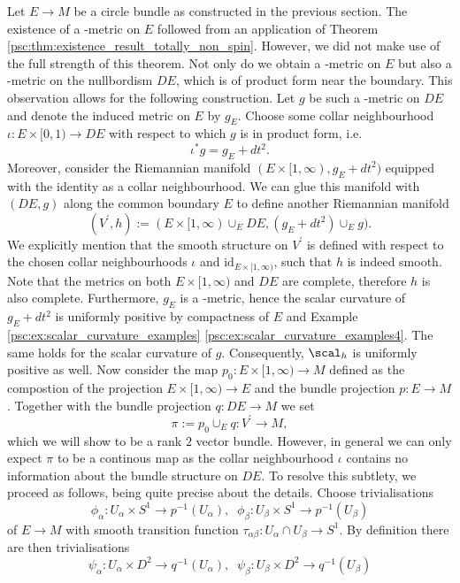 Let $E \to M$ be a circle bundle as constructed in the previous section. The existence of a \psc-metric on $E$ followed from an application of Theorem \ref{psc:thm:existence_result_totally_non_spin}. However, we did not make use of the full strength of this theorem. Not only do we obtain a \psc-metric on $E$ but also a \psc-metric on the nullbordism $DE$, which is of product form near the boundary. This observation allows for the following construction. Let $g$ be such a \psc-metric on $DE$ and denote the induced metric on $E$ by $g_E$. Choose some collar neighbourhood $\iota \colon E \times [0,1) \to DE$ with respect to which $g$ is in product form, i.e. 
\[
\iota^\ast g = g_E + dt^2.
\]
Moreover, consider the Riemannian manifold $(E \times [1,\infty), g_E + dt^2)$ equipped with the identity as a collar neighbourhood. We can glue this manifold with $(DE, g)$ along the common boundary $E$ to define another Riemannian manifold 
\[
(V^\prime, h) := (E \times [1,\infty) \cup_E DE, (g_E + dt^2) \cup_E g).
\]
We explicitly mention that the smooth structure on $V^\prime$ is defined with respect to the chosen collar neighbourhoods $\iota$ and $\mathrm{id}_{E \times [1,\infty)}$, such that $h$ is indeed smooth. Note that the metrics on both $E \times [1,\infty)$ and $DE$ are complete, therefore $h$ is also complete. Furthermore, $g_E$ is a \psc-metric, hence the scalar curvature of $g_E + dt^2$ is uniformly positive by compactness of $E$ and Example \ref{psc:ex:scalar_curvature_examples} \ref{psc:ex:scalar_curvature_examples4}. The same holds for the scalar curvature of $g$. Consequently, $\scal_h$ is uniformly positive as well. Now consider the map $p_0 \colon E \times [1,\infty) \to M$ defined as the compostion of the projection $E \times [1,\infty) \to E$ and the bundle projection $p \colon E \to M$. Together with the bundle projection $q \colon DE \to M$ we set
\[
\pi := p_0 \cup_E q \colon V^\prime \to M,
\] 
which we will show to be a rank $2$ vector bundle. However, in general we can only expect $\pi$ to be a continous map as the collar neighbourhood $\iota$ contains no information about the bundle structure on $DE$. To resolve this subtlety, we proceed as follows, being quite precise about the details. Choose trivialisations
\[
\phi_\alpha \colon U_\alpha \times S^1 \to p^{-1}(U_\alpha), \;\; \phi_\beta \colon U_\beta \times S^1 \to p^{-1}(U_\beta)
\]
of $E \to M$ with smooth transition function $\tau_{\alpha\beta} \colon U_\alpha \cap U_\beta \to S^1$. By definition there are then trivialisations
\[
\psi_\alpha \colon U_\alpha \times D^2 \to q^{-1}(U_\alpha), \;\; \psi_\beta \colon U_\beta \times D^2 \to q^{-1}(U_\beta)
\]
